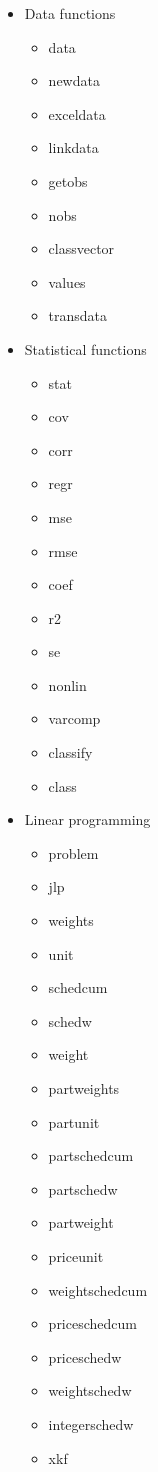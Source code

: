 \begin{itemize}
\item  Data functions
\begin{itemize}
\item data
\item newdata
\item exceldata
\item linkdata
\item getobs
\item nobs
\item classvector
\item values
\item transdata
\end{itemize}

\item  Statistical functions
\begin{itemize}
\item stat
\item cov
\item corr
\item regr
\item mse
\item rmse
\item coef
\item r2
\item se
\item nonlin
\item varcomp
\item classify
\item class
\end{itemize}

\item  Linear programming
\begin{itemize}
\item problem
\item jlp
\item weights
\item unit
\item schedcum
\item schedw
\item weight
\item partweights
\item partunit
\item partschedcum
\item partschedw
\item partweight
\item priceunit
\item weightschedcum
\item priceschedcum
\item priceschedw
\item weightschedw
\item integerschedw
\item xkf
\end{itemize}


\end{itemize}
